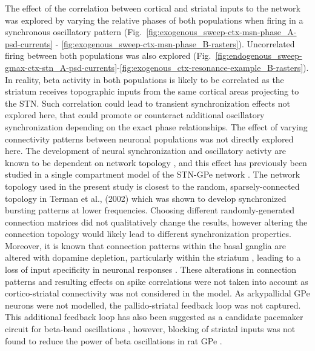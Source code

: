 %
The effect of the correlation between cortical and striatal inputs to the network was explored by varying the relative phases of both populations when firing in a synchronous oscillatory pattern (Fig.~\ref{fig:exogenous_sweep-ctx-msn-phase_A-psd-currents} - \ref{fig:exogenous_sweep-ctx-msn-phase_B-rasters}). Uncorrelated firing between both populations was also explored (Fig.~\ref{fig:endogenous_sweep-gmax-ctx-stn_A-psd-currents}-\ref{fig:exogenous_ctx-resonance-example_B-rasters}). In reality, beta activity in both populations is likely to be correlated as the striatum receives topographic inputs from the same cortical areas projecting to the STN. Such correlation could lead to transient synchronization effects not explored here, that could promote or counteract additional oscillatory synchronization depending on the exact phase relationships.
%
%
%
%
%
The effect of varying connectivity patterns between neuronal populations was not directly explored here. The development of neural synchronization and oscillatory activty are known to be dependent on network topology \cite{zhao_synchronization_2011}, and this effect has previously been studied in a single compartment model of the STN-GPe network \cite{terman_activity_2002}. The network topology used in the present study is closest to the random, sparsely-connected topology in Terman et al., (2002) which was shown to develop synchronized bursting patterns at lower frequencies. Choosing different randomly-generated connection matrices did not qualitatively change the results, however altering the connection topology would likely lead to different synchronization properties. Moreover, it is known that connection patterns within the basal ganglia are altered with dopamine depletion, particularly within the striatum \cite{cho_dopamine_2002}, leading to a loss of input specificity in neuronal responses \cite{bronfeld_loss_2011}. These alterations in connection patterns and resulting effects on spike correlations were not taken into account as cortico-striatal connectivity was not considered in the model. As arkypallidal GPe neurons were not modelled, the pallido-striatal feedback loop was not captured. This additional feedback loop has also been suggested as a candidate pacemaker circuit for beta-band oscillations \cite{corbit_pallidostriatal_2016}, however, blocking of striatal inputs was not found to reduce the power of beta oscillations in rat GPe \cite{tachibana_subthalamo-pallidal_2011}.
%


